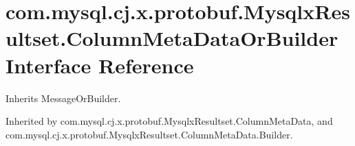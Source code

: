 \hypertarget{interfacecom_1_1mysql_1_1cj_1_1x_1_1protobuf_1_1_mysqlx_resultset_1_1_column_meta_data_or_builder}{}\section{com.\+mysql.\+cj.\+x.\+protobuf.\+Mysqlx\+Resultset.\+Column\+Meta\+Data\+Or\+Builder Interface Reference}
\label{interfacecom_1_1mysql_1_1cj_1_1x_1_1protobuf_1_1_mysqlx_resultset_1_1_column_meta_data_or_builder}


Inherits Message\+Or\+Builder.



Inherited by com.\+mysql.\+cj.\+x.\+protobuf.\+Mysqlx\+Resultset.\+Column\+Meta\+Data, and com.\+mysql.\+cj.\+x.\+protobuf.\+Mysqlx\+Resultset.\+Column\+Meta\+Data.\+Builder.

